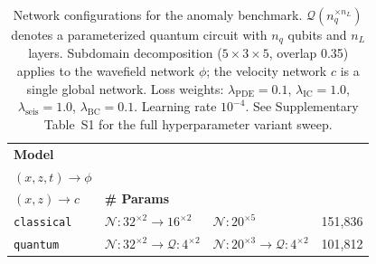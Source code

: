 \begin{table}[h]
\centering
\caption{Network configurations for the anomaly benchmark. $\mathcal{Q}(n_q^{\times n_L})$ denotes a parameterized quantum circuit with $n_q$ qubits and $n_L$ layers. Subdomain decomposition ($5\!\times\!3\!\times\!5$, overlap 0.35) applies to the wavefield network $\phi$; the velocity network $c$ is a single global network. Loss weights: $\lambda_\text{PDE}\!=\!0.1$, $\lambda_\text{IC}\!=\!1.0$, $\lambda_\text{seis}\!=\!1.0$, $\lambda_\text{BC}\!=\!0.1$. Learning rate $10^{-4}$. See Supplementary Table~S1 for the full hyperparameter variant sweep.}
\label{tab:hyperparams_main}
\begin{tabular}{l l l r}
\toprule
\textbf{Model} & \makecell[l]{$\boldsymbol{\phi}$ \textbf{network}\\$(x,z,t)\!\to\!\phi$} & \makecell[l]{$\boldsymbol{c}$ \textbf{network}\\$(x,z)\!\to\!c$} & \textbf{\# Params} \\
\midrule
\texttt{classical} & $\mathcal{N}\!: 32^{\times 2}\!\to\!16^{\times 2}$ & $\mathcal{N}\!: 20^{\times 5}$ & 151{,}836 \\
\texttt{quantum}   & $\mathcal{N}\!: 32^{\times 2}\!\to\!\mathcal{Q}\!: 4^{\times 2}$ & $\mathcal{N}\!: 20^{\times 3}\!\to\!\mathcal{Q}\!: 4^{\times 2}$ & 101{,}812 \\
\bottomrule
\end{tabular}
\end{table}


